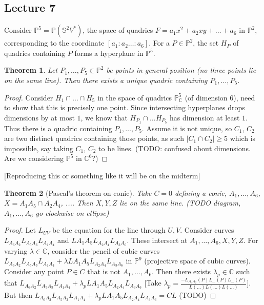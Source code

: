 \documentclass[12pt]{article}
\newcommand{\C}{\mathbb{C}}
\renewcommand{\P}{\mathbb{P}}
\renewcommand{\S}{\mathbb{S}}
\newtheorem{theorem}{Theorem}
\begin{document}
    \subsection{Lecture 7}
    Consider $\P^5 = \P(\S^2V^*)$, the space of quadrics $F = a_1x^2 + a_2xy + \dots + a_6$ in $\P^2$, corresponding to the coordinate $[a_1:a_2\dots :a_6]$. For a $P \in \P^2$, the set $H_P$ of quadrics containing $P$ forms a hyperplane in $\P^5$. \par 
    [The proof of this will probably be on the exam]
    \begin{theorem}
        Let $P_1, \dots, P_5 \in \P^2$ be points in general position (no three points lie on the same line). Then there exists a unique quadric containing $P_1, \dots, P_5$. 
    \end{theorem}
    \begin{proof}
        Consider $H_1 \cap \dots \cap H_5$ in the space of quadrics $\P_\C^5$ (of dimension $6$), need to show that this is precisely one point. Since intersecting hyperplanes drops dimensions by at most $1$, we know that $H_{P_1} \cap \dots H_{P_5}$ has dimension at least $1$. Thus there is a quadric containing $P_1, \dots, P_5$. Assume it is not unique, so $C_1$, $C_2$ are two distinct quadrics containing those points, as such $|C_1 \cap C_2| \geq 5$ which is impossible, say taking $C_1$, $C_2$ to be lines. (TODO: confused about dimensions. Are we considering $\P^5$ in $\C^6$?)
    \end{proof}
    [Reproducing this or something like it will be on the midterm]
    \begin{theorem}
        [Pascal's theorem on conic] Take $C = 0$ defining a conic, $A_1, \dots, A_6$, $X = A_1A_5 \cap A_2A_4$, .... Then $X, Y, Z$ lie on the same line. (TODO diagram, $A_1, \dots, A_6$ go clockwise on ellipse)
    \end{theorem}
    \begin{proof}
        Let $L_{UV}$ be the equation for the line through $U, V$. Consider curves $L_{A_6A_2}L_{A_5A_3}L_{A_1A_4}$ and $L{A_1A_5}L_{A_2A_4}L_{A_3A_6}$. These intersect at $A_1, \dots, A_6, X, Y, Z$. For varying $\lambda \in \C$, consider the pencil of cubic curves $L_{A_6A_2}L_{A_5A_3}L_{A_1A_4} + \lambda L{A_1A_5}L_{A_2A_4}L_{A_3A_6}$ in $\P^9$ (projective space of cubic curves). Consider any point $P \in C$ that is not $A_1, \dots, A_6$. Then there exists $\lambda_p \in \C$ such that $L_{A_6A_2}L_{A_5A_3}L_{A_1A_4} + \lambda_p L{A_1A_5}L_{A_2A_4}L_{A_3A_6}$ [Take $\lambda_p = \frac{-L_{A_4A_2}(P)L_{...}(P)L_{...}(P)}{L(...)L(...)L(...)}$]. But then $L_{A_6A_2}L_{A_5A_3}L_{A_1A_4} + \lambda_p L{A_1A_5}L_{A_2A_4}L_{A_3A_6} = CL$ (TODO)
    \end{proof}
\end{document}

